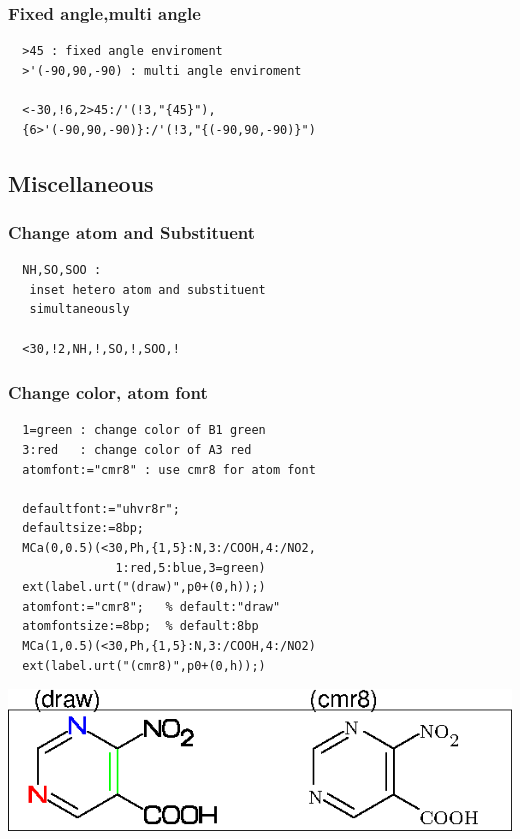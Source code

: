 \documentclass[a4paper]{article}
\makeatletter
\def\MCFstructure{\hspace{5mm}{\@strufont\char\fontnum}\advance\fontnum\@ne\relax}%
\makeatother
\begin{document}
\subsubsection{Fixed angle,multi angle}
\begin{verbatim}
  >45 : fixed angle enviroment
  >'(-90,90,-90) : multi angle enviroment

  <-30,!6,2>45:/'(!3,"{45}"),
  {6>'(-90,90,-90)}:/'(!3,"{(-90,90,-90)}")
\end{verbatim}
\MCFstructure
\subsection{Miscellaneous}
\subsubsection{Change atom and Substituent}
\begin{verbatim}
  NH,SO,SOO :
   inset hetero atom and substituent
   simultaneously

  <30,!2,NH,!,SO,!,SOO,!
\end{verbatim}
\MCFstructure
\subsubsection{Change color, atom font}
\begin{verbatim}
  1=green : change color of B1 green
  3:red   : change color of A3 red
  atomfont:="cmr8" : use cmr8 for atom font

  defaultfont:="uhvr8r";
  defaultsize:=8bp;
  MCa(0,0.5)(<30,Ph,{1,5}:N,3:/COOH,4:/NO2,
               1:red,5:blue,3=green)
  ext(label.urt("(draw)",p0+(0,h));)
  atomfont:="cmr8";   % default:"draw"
  atomfontsize:=8bp;  % default:8bp
  MCa(1,0.5)(<30,Ph,{1,5}:N,3:/COOH,4:/NO2)
  ext(label.urt("(cmr8)",p0+(0,h));)
\end{verbatim}
\hspace{5mm}\includegraphics{mcf_man_soc-064.eps}%
\advance\fontnum\@ne\relax\advance\tempnum\@ne\relax%
\end{document}
